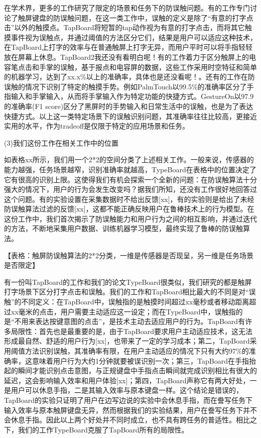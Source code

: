 在学术界，更多的工作研究了限定的场景和任务下的防误触问题。有的工作专门讨论了触屏键盘的防误触问题\cite{2013-TapBoard,2016-TapBoard2}，在这一类工作中，误触的定义是除了“有意的打字点击”以外的触摸点。TapBoard\cite{2013-TapBoard}将短暂的tap动作视为有意的打字点击，而将其它触摸事件视为误触点，并通过阈值的方法区分它们，结果是用户可以适应这种技术，在TapBoard上打字的效率与在普通触屏上打字无异，而用户平时可以将手指轻轻放在屏幕上休息。TapBoard2\cite{2016-TapBoard2}我还没有看明白呢！有的工作着力于区分触屏上的电容笔点击和手掌的误触，基于报点和电容屏的数据，这些工作采用时空特征和简单的机器学习，达到了xx.x\%以上的准确率，具体也是还没看呢！\cite{2013-PalmInput,2014-PenUnint,2014-PalmRejection}。还有的工作在防误触的情况下识别了特定的触摸手势。例如PalmTouch\cite{2018-PalmTouch}以99.5\%的准确率区分了手指输入和手掌输入，从而将手掌输入作为特定功能的快捷方式。GestureOn\cite{2015-GestureOn}以97.9的准确率(F1 score)区分了黑屏时的手势输入和日常生活中的误触，也是为了表达快捷方式。以上这一类特定场景下的误触识别问题，其准确率往往比较高，更接近实用的水平，作为tradeoff是仅限于特定的应用场景和任务。

(3)我们这份工作在相关工作中的位置

如表格xx所示，我们用一个2*2的空间分类了上述相关工作。一般来说，传感器的能力越强，任务场景越窄，识别准确率就越高，TypeBoard在表格中的位置决定了它有很高的识别上限。这使得我们有机会探索一个全新的问题：在防误触算法十分强大的情况下，用户的行为会发生改变吗？据我们所知，还没有工作很好地回答过这个问题。有的实验设置在采集数据时不给出反馈[xx]，有的实验则是给出了未经防误触算法过滤的反馈[xx]，这都不能正确反映用户在鲁棒技术上的行为模型。在这份工作中，我们首次揭示了防误触能力和用户行为之间的相互影响，并通过迭代的方法，不断地采集用户数据、训练机器学习模型，最终实现了鲁棒的防误触算法。

【表格：触屏防误触算法的2*2分类，一维是传感器是否现呈，另一维是任务场景是否限定】

有一份叫TapBoard的工作和我们的论文TypeBoard很类似\cite{2013-TapBoard}，我们研究的都是触屏打字场景下区分打字点击和误触。我们的工作和TapBoard相比最大的不同是对“误触”的不同定义：在TapBoard中，误触指的是触摸时间超过xx毫秒或者移动距离超过xx毫米的点击，用户需要主动适应这一设定；而在TypeBoard中，误触指的是“不用来表达按键意图的点击”，是技术主动去适应用户的行为。TapBoard有许多局限性：首先也是最重要的是，由于TapBoard要求用户主动适应技术，这无法形成最自然、舒适的用户行为[xx]，也带来了一定的学习成本；第二，TapBoard采用阈值方法识别误触，其准确率有限，在用户主动适应的情况下只有大约97\%的准确率，这意味着用户行为大约1分钟就要被误识别一次；第三，TapBoard在手指抬起的瞬间才能识别点击意图，与正规键盘中手指点击瞬间就完成识别相比有很大的延迟，这会影响输入效率和用户体验[xx]；第四，TapBoard声称它有两大好处，一是用户可以休息手指，二是其输入效率与原本键盘一样。这个结论是错误的，TapBoard的实验只证明了用户在边写边说的实验中会休息手指，而在誊写任务下输入效率与原本触屏键盘无异，然而根据我们的实验结果，用户在誊写任务下并不会休息手指。因此以上两个好处并不同时成立，也不具有跨任务的普适性。相比之下，我们的工作TypeBoard克服了TapBoard所有的局限性。

